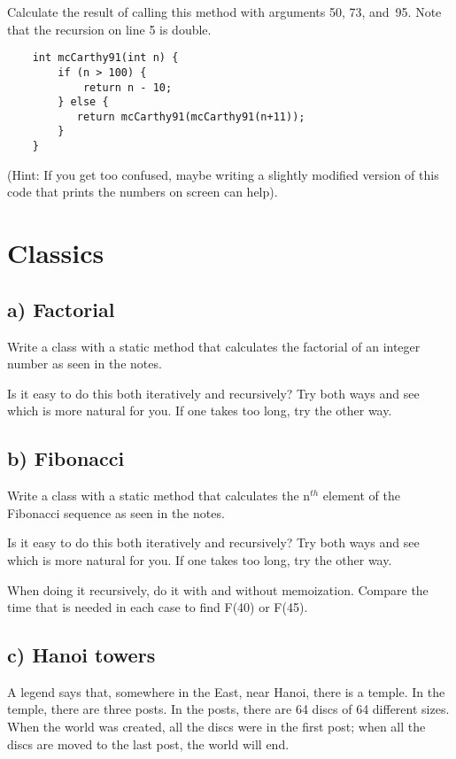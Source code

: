 \documentclass{article}
\begin{document}
Calculate the result of calling this method with arguments 50, 73, 
and~95. Note that the recursion on line 5 is double. 

\begin{verbatim}
    int mcCarthy91(int n) {
        if (n > 100) {
            return n - 10;
        } else {
           return mcCarthy91(mcCarthy91(n+11));
        }
    }
\end{verbatim}

(Hint: If you get too confused, maybe writing a slightly modified
version of this code that prints the numbers on screen can help).

\section{Classics}

\subsection{a) Factorial }

Write a class with a static method that calculates the factorial of an
integer number as seen in the notes. 

Is it easy to do this both iteratively and recursively? Try both ways
and see which is more natural for you. If one takes too long, try the
other way. 

\subsection{b) Fibonacci }

Write a class with a static method that calculates the n$^{th}$ element
of the Fibonacci sequence as seen in the notes. 

Is it easy to do this both iteratively and recursively? Try both ways
and see which is more natural for you. If one takes too long, try the
other way. 

When doing it recursively, do it with and without memoization. Compare
the time that is needed in each case to find F(40) or F(45). 

\subsection{c) Hanoi towers}

A legend says that, somewhere in the East, near Hanoi, there is a
temple. In the temple, there are three posts. In the posts, there are
64 discs of 64 different sizes. When the world was created, all the
discs were in the first post; when all the discs are moved to the
last post, the world will end. 
\end{document}
